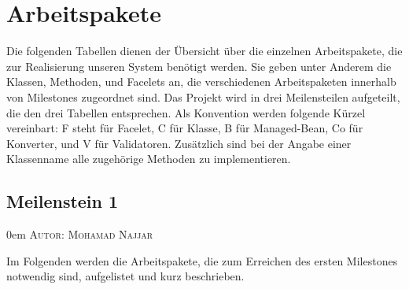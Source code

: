 \documentclass{article}
\makeatletter
\newcommand{\sectionauthor}[1]{
	{\parindent 0em \large \scshape Autor: #1 \par \nobreak \vspace*{1em}}
	\@afterheading
}
\makeatother
\begin{document}
\section{Arbeitspakete}
Die folgenden Tabellen dienen der Übersicht über die einzelnen Arbeitspakete, die zur Realisierung unseren System benötigt werden.
Sie geben unter Anderem die Klassen, Methoden, und Facelets an, die verschiedenen Arbeitspaketen innerhalb von Milestones zugeordnet sind. 
Das Projekt wird in drei Meilensteilen aufgeteilt, die den drei Tabellen entsprechen.
Als Konvention werden folgende Kürzel vereinbart: F steht für Facelet, C für Klasse, B für Managed-Bean, Co für Konverter, und V für Validatoren.
Zusätzlich sind bei der Angabe einer Klassenname alle zugehörige Methoden zu implementieren. 


\subsection{Meilenstein 1}
\sectionauthor{Mohamad Najjar}

Im Folgenden werden die Arbeitspakete, die zum Erreichen des ersten Milestones notwendig sind, aufgelistet und kurz beschrieben. 
\end{document}
